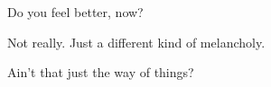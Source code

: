\label{ally:16}
\begin{paracol}{2}
  \begin{leftcolumn}

\null
\vfill
\begin{ally}
Do you feel better, now?
\end{ally}

Not really. Just a different kind of melancholy.

\begin{ally}
Ain't that just the way of things?
\end{ally}
\vfill
\newpage

\end{leftcolumn}
\end{paracol}

